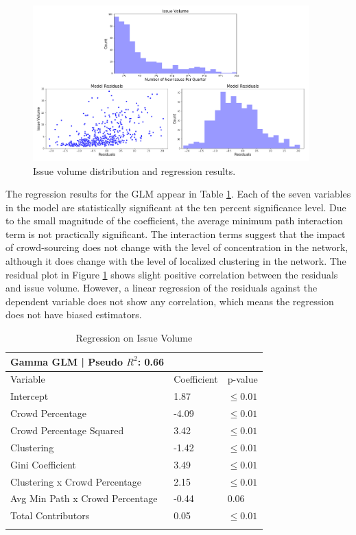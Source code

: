 \begin{figure}
  \includegraphics[width=0.95\textwidth]{issue_volume_results.PNG}
\caption{Issue volume distribution and regression results.}
\label{issue_volume_results}
\end{figure}

The regression results for the GLM appear in Table \ref{issue_volume_regression}. Each of the seven variables in the model are statistically significant at the ten percent significance level. Due to the small magnitude of the coefficient, the average minimum path interaction term is not practically significant. The interaction terms suggest that the impact of crowd-sourcing does not change with the level of concentration in the network, although it does change with the level of localized clustering in the network. The residual plot in Figure \ref{issue_volume_results} shows slight positive correlation between the residuals and issue volume. However, a linear regression of the residuals against the dependent variable does not show any correlation, which means the regression does not have biased estimators.

\begin{table}
\caption{Regression on Issue Volume}
\label{issue_volume_regression}
\begin{tabular}{lll}
Gamma GLM | Pseudo $R^2$: 0.66 \\
\hline\noalign{\smallskip}
Variable & Coefficient & p-value  \\
\noalign{\smallskip}\hline\noalign{\smallskip}
Intercept & 1.87 & $\leq 0.01$ \\
Crowd Percentage & -4.09 & $\leq 0.01$  \\
Crowd Percentage Squared & 3.42 & $\leq 0.01$  \\
Clustering & -1.42 & $\leq 0.01$  \\
Gini Coefficient & 3.49 & $\leq 0.01$  \\
Clustering x Crowd Percentage & 2.15 & $\leq 0.01$  \\
Avg Min Path x Crowd Percentage & -0.44 & 0.06 \\
Total Contributors & 0.05 & $\leq 0.01$ \\
\noalign{\smallskip}\hline
\end{tabular}
\end{table}

